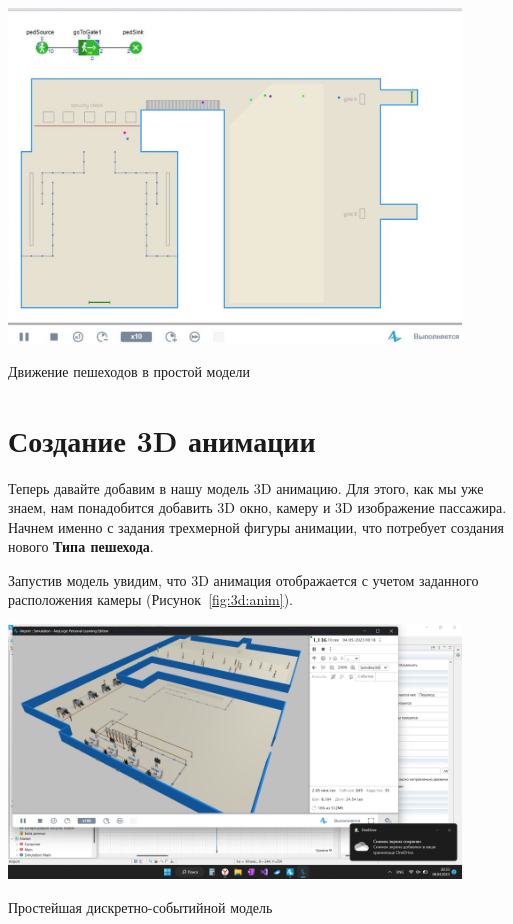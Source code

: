 \begin{image}
	\includegraphics[width=0.9\textwidth]{Screenshot from 2023-04-11 14-47-00}
	\caption{Движение пешеходов в простой модели}
	\label{fig:model:easy}
\end{image}

\section{Создание 3D анимации}
Теперь давайте добавим в нашу модель 3D анимацию. Для этого, как мы уже
знаем, нам понадобится добавить 3D окно, камеру и 3D изображение
пассажира. Начнем именно с задания трехмерной фигуры анимации, что
потребует создания нового \textbf{Типа пешехода}.\par
Запустив модель увидим, что 3D анимация отображается
с учетом заданного расположения камеры (Рисунок~\ref{fig:3d:anim}).

\begin{image}
	\includegraphics[width=0.9\textwidth]{2023-04-08 (1)}
	\caption{Простейшая дискретно-событийной модель}
	\label{fig:3d:anim}
\end{image}

